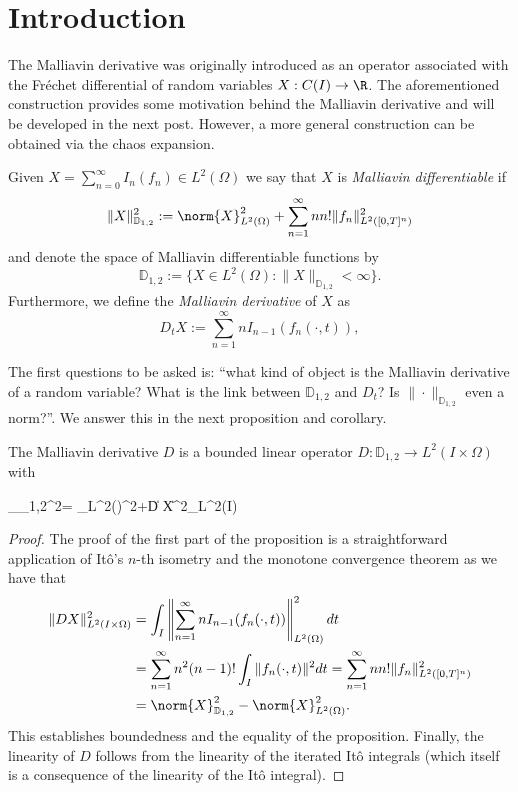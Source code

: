 \documentclass[
    a4paper,
    DIV=14,
    abstract=true,
    numbers=noenddot
]{scrartcl}
\begin{document}
\section{Introduction}
The Malliavin derivative was originally introduced as an operator associated with the Fréchet differential of random variables $X: C(I)\to \R$. The aforementioned construction provides some motivation behind the Malliavin derivative and will be developed in the next post. However, a more general construction  can be obtained via the chaos expansion.
\begin{definition}\label{malnormdef}
	Given $X=\sum_{n=0}^{\infty} I_n(f_n)\in L^2(\Omega)$ we say that $X$ is \emph{Malliavin differentiable} if
	\begin{equation*}
		\|X\|_{\mathbb{D}_{1,2}}^2 := \norm{X}_{L^2(\Omega)}^2  + \sum_{n=1}^{\infty} n n!\|f_n\|_{L^2([0,T]^n)}^2
	\end{equation*}
	and denote the space of Malliavin differentiable functions by
	\begin{equation*}
		\mathbb{D}_{1,2}:=\{X\in L^2(\Omega):\|X\|_{\mathbb{D}_{1,2}}<\infty\}.
	\end{equation*}
	Furthermore, we define the \emph{Malliavin derivative} of $X$ as
	\begin{equation*}
		D_tX:=\sum_{n=1}^{\infty} n I_{n-1}(f_{n}(\cdot ,t)),
	\end{equation*}
\end{definition}
The first questions to be asked is: ``what kind of object is the Malliavin derivative of a random variable? What is the link between $\mathbb{D}_{1,2}$ and $D_t$? Is $\|\cdot \|_{\mathbb{D}_{1,2}}$ even a norm?''. We answer this in the next proposition and corollary.
\begin{proposition}
	The Malliavin derivative $D$ is a bounded linear operator  $D:\mathbb{D}_{1,2} \to L^2(I \times \Omega)$ with 
\begin{aligneq*}
	_{_{1,2}}^2= _{L^2(\Omega)}^2+\|D  X\|^2_{L^2(I\times\Omega)}
\end{aligneq*}
\end{proposition}
\begin{proof}
	The proof of the first part of the proposition is a straightforward application of Itô's $n$-th isometry and the monotone convergence theorem as we have that
	\begin{align*}
		\|D  X\|^2_{L^2(I\times\Omega)}&=\int_{I}\left\|\sum_{n=1}^{\infty} n I_{n-1}(f_{n}(\cdot ,t))\right\|_{L^2(\Omega)}^2 d t\\
		&=\sum_{n=1}^{\infty} n^2(n-1)!\int_{I}\|f_n(\cdot ,t)\|^2 dt=\sum_{n=1}^{\infty} n n!\|f_{n}\|^2_{L^2([0,T]^n)}\\
		&=\norm{X}_{\mathbb{D}_{1,2}}^2- \norm{X}_{L^2(\Omega)}^2.
	\end{align*}
	This establishes boundedness and the equality of the proposition. Finally, the linearity of $D$ follows from the linearity of the iterated Itô integrals (which itself is a consequence of the linearity of the Itô integral).
\end{proof}
\end{document}
